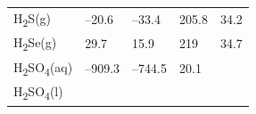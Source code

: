 \documentclass[
  9pt,
]{extbook}
\theoremstyle{definition}
\theoremstyle{definition}
\theoremstyle{definition}
\theoremstyle{remark}
\begin{document}
\begin{longtable}[]{@{}lllll@{}}
\begin{minipage}[t]{0.10\columnwidth}
H\textsubscript{2}S(g)\strut
\end{minipage} & \begin{minipage}[t]{0.19\columnwidth}\raggedright
--20.6\strut
\end{minipage} & \begin{minipage}[t]{0.20\columnwidth}\raggedright
--33.4\strut
\end{minipage} & \begin{minipage}[t]{0.18\columnwidth}\raggedright
205.8\strut
\end{minipage} & \begin{minipage}[t]{0.18\columnwidth}\raggedright
34.2\strut
\end{minipage}\tabularnewline
\begin{minipage}[t]{0.10\columnwidth}\raggedright
H\textsubscript{2}Se(g)\strut
\end{minipage} & \begin{minipage}[t]{0.19\columnwidth}\raggedright
29.7\strut
\end{minipage} & \begin{minipage}[t]{0.20\columnwidth}\raggedright
15.9\strut
\end{minipage} & \begin{minipage}[t]{0.18\columnwidth}\raggedright
219\strut
\end{minipage} & \begin{minipage}[t]{0.18\columnwidth}\raggedright
34.7\strut
\end{minipage}\tabularnewline
\begin{minipage}[t]{0.10\columnwidth}\raggedright
H\textsubscript{2}SO\textsubscript{4}(aq)\strut
\end{minipage} & \begin{minipage}[t]{0.19\columnwidth}\raggedright
--909.3\strut
\end{minipage} & \begin{minipage}[t]{0.20\columnwidth}\raggedright
--744.5\strut
\end{minipage} & \begin{minipage}[t]{0.18\columnwidth}\raggedright
20.1\strut
\end{minipage} & \begin{minipage}[t]{0.18\columnwidth}\raggedright
\strut
\end{minipage}\tabularnewline
\begin{minipage}[t]{0.10\columnwidth}\raggedright
H\textsubscript{2}SO\textsubscript{4}(l)\strut
\end{minipage} & \begin{minipage}[t]{0.19\columnwidth}\raggedright

\end{minipage}
\end{longtable}
\end{document}
